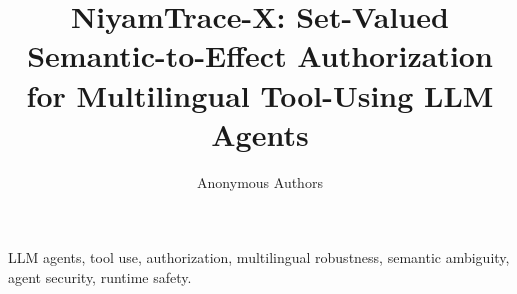 \documentclass[journal]{IEEEtran}
\title{NiyamTrace-X: Set-Valued Semantic-to-Effect Authorization for Multilingual Tool-Using LLM Agents}
\author{Anonymous Authors}
\begin{document}
\maketitle
\begin{abstract}

\end{abstract}
\begin{IEEEkeywords}
LLM agents, tool use, authorization, multilingual robustness, semantic ambiguity, agent security, runtime safety.
\end{IEEEkeywords}

\balance


\end{document}

